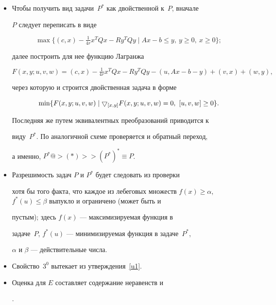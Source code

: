 \begin{itemize}


\item[1.] Чтобы получить вид задачи~$P^*$ как двойственной к~$P$, вначале


$P$ следует переписать в виде


$$


\max \{ (c, x) -


\tfrac{1}{4r} x^T Q x -R y^T Q y \mid Ax-b\leq y, \


y\geq 0,\ x\geq 0\};


$$


далее построить для нее функцию Лагранжа


$$


F(x,y;u,v,w) = (c, x) -\tfrac{1}{4r} x^T Q x


-R y^T Q y -(u, Ax-b-y) +(v, x) +(w, y),


$$


через которую и строится двойственная задача в форме


$$


\min \{F(x,y;u,v,w) \mid \btd_{[x,y]} F(x,y;u,v,w) =0, \


[u, v, w]\geq 0\}.


$$


Последняя же путем эквивалентных преобразований приводится к


виду~$P^*$. По аналогичной схеме проверяется и обратный переход,


а именно, $P^* @>{(*)}>> (P^*)^* \equiv P$.


\item[2.] Разрешимость задач $P$ и $P^*$ будет следовать из проверки


хотя бы того факта, что каждое из лебеговых множеств $f(x)\geq


\alpha$, $f^*(u)\leq \beta$ выпукло и ограничено (может быть и


пустым); здесь $f(x)$ --- максимизируемая функция в


задаче~$P$, $f^*(u)$ --- минимизируемая функция в задаче~$P^*$, 


$\alpha$ и $\beta$ --- действительные числа.


\item[3.] Свойство~$3^0$ вытекает из утверждения~\ref{u1}.


\item[4.] Оценка для $E$ составляет содержание неравенств  и


.


\end{itemize}





